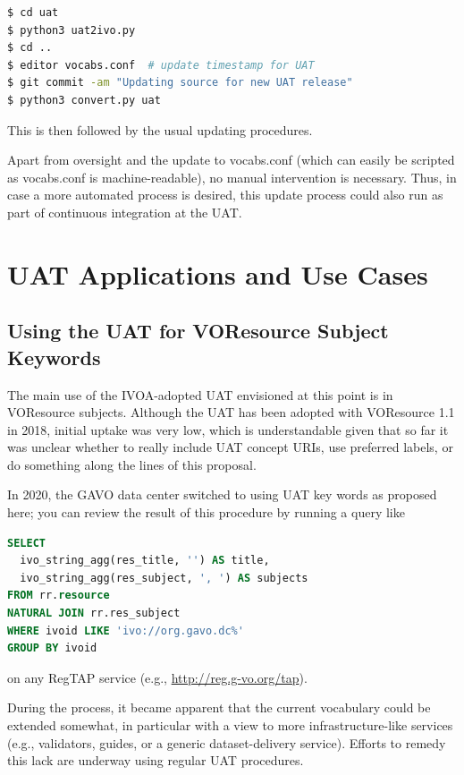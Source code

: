 \documentclass[11pt,a4paper]{ivoa}
\begin{document}
\begin{lstlisting}[language=sh]
$ cd uat
$ python3 uat2ivo.py
$ cd ..
$ editor vocabs.conf  # update timestamp for UAT
$ git commit -am "Updating source for new UAT release"
$ python3 convert.py uat
\end{lstlisting}

This is then followed by the usual updating procedures.

Apart from oversight and the update to vocabs.conf (which can easily be
scripted as vocabs.conf is machine-readable),  no manual intervention is
necessary.  Thus, in case a more automated process is desired, this
update process could also run as part of continuous integration at the
UAT.

\section{UAT Applications and Use Cases}

\subsection{Using the UAT for VOResource Subject Keywords}

The main use of the IVOA-adopted UAT envisioned at this point is in
VOResource subjects.  Although the UAT has been adopted with VOResource
1.1 in 2018, initial uptake was very low, which is
understandable given that so far it was unclear whether to really include UAT
concept URIs, use preferred labels, or do something along the
lines of this proposal.

In 2020, the GAVO data center switched to using UAT key words as
proposed here; you can review the result of this procedure by running
a query like

\begin{minipage}{12cm}
\begin{lstlisting}[language=SQL]
SELECT 
  ivo_string_agg(res_title, '') AS title,
  ivo_string_agg(res_subject, ', ') AS subjects
FROM rr.resource
NATURAL JOIN rr.res_subject
WHERE ivoid LIKE 'ivo://org.gavo.dc%'
GROUP BY ivoid
\end{lstlisting}
\end{minipage}

\noindent on any RegTAP service (e.g., \url{http://reg.g-vo.org/tap}).

During the process, it became apparent that the current vocabulary could
be extended somewhat, in particular with a view to more
infrastructure-like services (e.g., validators, guides, or a generic
dataset-delivery service).  Efforts to remedy this lack are underway
using regular UAT procedures.
\end{document}

